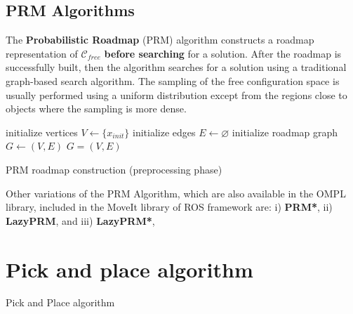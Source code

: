 \subsection{PRM Algorithms}
%
The \textbf{Probabilistic Roadmap} (PRM) algorithm constructs a roadmap representation of $\mathcal{C}_{free}$ \textbf{before searching} for a solution. After the roadmap is successfully built, then the algorithm searches for a solution using a traditional graph-based search algorithm. The sampling of the free configuration space is usually performed using a uniform distribution except from the regions close to objects where the sampling is more dense.

\begin{algorithm}[H]
\SetAlgoLined
initialize vertices $V \leftarrow \lbrace x_{init} \rbrace$\;
initialize edges $E \leftarrow \varnothing$\;
initialize roadmap graph $G \leftarrow (V,E)$\;
\Return $G=(V,E)$
\caption{PRM roadmap construction (preprocessing phase)}
\end{algorithm}

Other variations of the PRM Algorithm, which are also available in the OMPL library, included in the MoveIt library of ROS framework  are: i) \textbf{PRM*}, ii)  \textbf{LazyPRM}, and iii) \textbf{LazyPRM*},
%
\section{Pick and place algorithm}
%
\begin{algorithm}[H]
\SetAlgoLined
{}
\caption{Pick and Place algorithm}
\end{algorithm}


